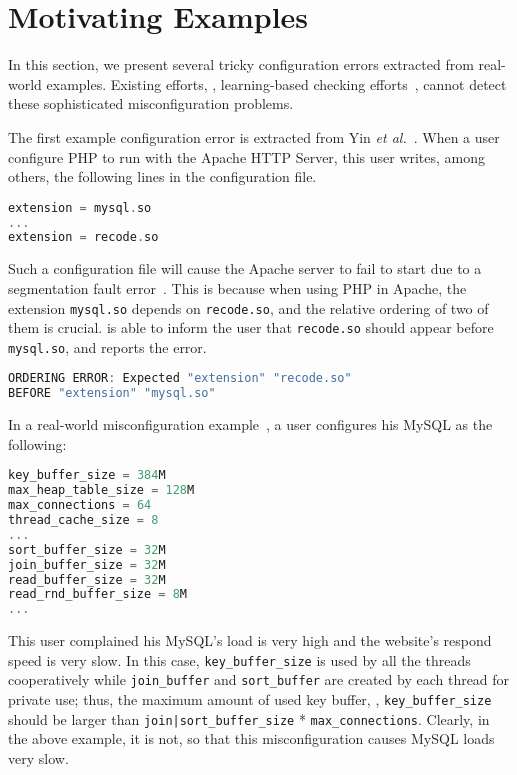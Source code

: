 \section{Motivating Examples}
\label{sec-motiv}

In this section, we present several tricky configuration errors
extracted from real-world examples. 
Existing efforts, \eg, learning-based checking
efforts~\cite{zhang14encore, wang04automatic}, cannot detect
these sophisticated misconfiguration problems.

The first example configuration error is extracted from 
Yin {\em et al.}~\cite{yin11anempirical}.
When a user configure PHP to run with the
Apache HTTP Server, this user writes, among others, the following lines
in the configuration file.

\begin{lstlisting}[language=C]
extension = mysql.so
...
extension = recode.so
\end{lstlisting} 

Such a configuration file will cause the Apache server to 
fail to start due to a segmentation fault error~\cite{yin11anempirical}. 
This is because when using PHP in Apache, the extension {\tt mysql.so} 
depends on {\tt recode.so}, and the relative ordering of two of them 
is crucial. \app is able to inform the user that {\tt recode.so} 
should appear before {\tt mysql.so}, and reports the error.

\begin{lstlisting}[language=C]
ORDERING ERROR: Expected "extension" "recode.so"
BEFORE "extension" "mysql.so"
\end{lstlisting} 

In a real-world misconfiguration example~\cite{correlation}, 
a user configures his MySQL as the following:

\begin{lstlisting}[language=C]
key_buffer_size = 384M
max_heap_table_size = 128M
max_connections = 64
thread_cache_size = 8
...
sort_buffer_size = 32M
join_buffer_size = 32M
read_buffer_size = 32M
read_rnd_buffer_size = 8M
...
\end{lstlisting} 

This user complained his MySQL's load is very high and the website's
respond speed is very slow.
In this case, {\tt key\_buffer\_size} is used by all the threads
cooperatively while {\tt join\_buffer} and {\tt sort\_buffer} are 
created by each thread for private use; thus, the maximum amount
of used key buffer, \ie, {\tt key\_buffer\_size} should be larger than 
{\tt join|sort\_buffer\_size} * {\tt max\_connections}. 
Clearly, in the above example, it is not, so that this misconfiguration
causes MySQL loads very slow.

